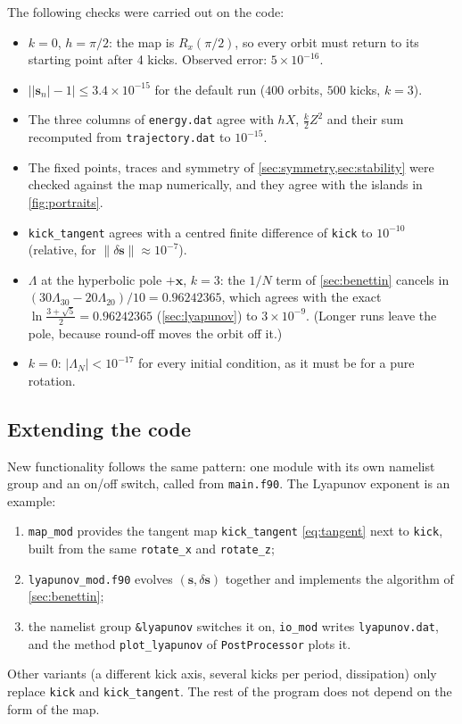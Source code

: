 \documentclass[11pt,a4paper]{article}
\newcommand{\vs}{\bm{s}}
\begin{document}
The following checks were carried out on the code:
\begin{itemize}
  \item $k = 0$, $h = \pi/2$: the map is $R_x(\pi/2)$, so every orbit must return to its starting point after 4 kicks.
  Observed error: $5\times10^{-16}$.
  \item $\big||\vs_n| - 1\big| \le 3.4\times10^{-15}$ for the default run ($400$ orbits, $500$ kicks, $k=3$).
  \item The three columns of \texttt{energy.dat} agree with $hX$, $\frac k2 Z^2$ and their sum recomputed from
  \texttt{trajectory.dat} to $10^{-15}$.
  \item The fixed points, traces and symmetry of \cref{sec:symmetry,sec:stability} were checked against the map
  numerically, and they agree with the islands in \cref{fig:portraits}.
  \item \texttt{kick\_tangent} agrees with a centred finite difference of \texttt{kick} to $10^{-10}$ (relative, for
  $\|\delta\vs\| \approx 10^{-7}$).
  \item $\Lambda$ at the hyperbolic pole $+\hat{\bm x}$, $k = 3$: the $1/N$ term of \cref{sec:benettin} cancels in
  $(30\Lambda_{30} - 20\Lambda_{20})/10 = 0.96242365$, which agrees with the exact $\ln\frac{3+\sqrt5}{2} =
  0.96242365$ (\cref{sec:lyapunov}) to $3\times10^{-9}$. (Longer runs leave the pole, because round-off moves the orbit
  off it.)
  \item $k = 0$: $|\Lambda_N| < 10^{-17}$ for every initial condition, as it must be for a pure rotation.
\end{itemize}

\subsection{Extending the code}\label{sec:extend}

New functionality follows the same pattern: one module with its own namelist group and an on/off switch, called from
\texttt{main.f90}. The Lyapunov exponent is an example:
\begin{enumerate}
  \item \texttt{map\_mod} provides the tangent map \texttt{kick\_tangent} \eqref{eq:tangent} next to \texttt{kick},
  built from the same \texttt{rotate\_x} and \texttt{rotate\_z};
  \item \texttt{lyapunov\_mod.f90} evolves $(\vs, \delta\vs)$ together and implements the algorithm of
  \cref{sec:benettin};
  \item the namelist group \texttt{\&lyapunov} switches it on, \texttt{io\_mod} writes \texttt{lyapunov.dat}, and the
  method \texttt{plot\_lyapunov} of \texttt{PostProcessor} plots it.
\end{enumerate}
Other variants (a different kick axis, several kicks per period, dissipation) only replace \texttt{kick} and
\texttt{kick\_tangent}. The rest of the program does not depend on the form of the map.
\end{document}
